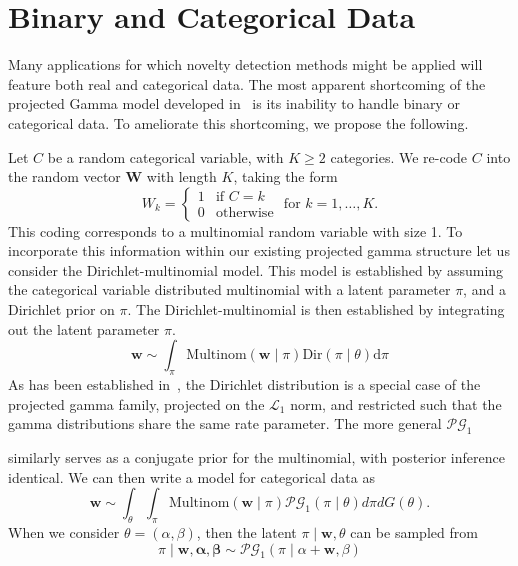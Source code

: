 \section{Binary and Categorical Data}
Many applications for which novelty detection methods might be applied will 
    feature both real and categorical data.   The most apparent 
    shortcoming of the projected Gamma model developed in~\cite{trubey:pg} is
    its inability to handle binary or categorical data.  To ameliorate this 
    shortcoming, we propose the following.

Let $C$ be a random categorical variable, with $K \geq 2$ categories.  We 
    re-code $C$ into the random vector $\bm{W}$ with length $K$, taking the form
    \begin{equation*}
        W_k = \begin{cases}
            1 &\text{if }C = k\\
            0 &\text{otherwise}
            \end{cases} \text{ for }k = 1,\ldots, K.
    \end{equation*}
    This coding corresponds to a multinomial random variable with size 1. To 
    incorporate this information within our existing projected gamma structure
    let us consider the Dirichlet-multinomial model.  This model is established by
    assuming the categorical variable distributed multinomial with a latent 
    parameter $\pi$, and a Dirichlet prior on $\pi$. The Dirichlet-multinomial is 
    then established by integrating out the latent parameter $\pi$. 
    \begin{equation*}
    \bm{w} \sim \int_{\pi} \text{Multinom}(\bm{w}\mid\pi)\text{Dir}(\pi\mid\theta)\text{d}\pi
    \end{equation*}
    As has been established in~\cite{trubey:pg}, the Dirichlet distribution is a 
    special case of the projected gamma family, projected on the $\mathcal{L}_1$ 
    norm, and restricted such that the gamma distributions share the same rate
    parameter. The more general $\mathcal{PG}_1$ 
    
    
    
    
    similarly serves as a conjugate prior 
    for the multinomial, with posterior inference identical.  We can then write a 
    model for categorical data as
    \begin{equation}
        \label{model:cat}
        \bm{w} \sim \int_{\theta}\int_{\pi}\text{Multinom}(\bm{w}\mid \pi)
                              \mathcal{PG}_1(\pi\mid \theta)d\pi dG(\theta).
    \end{equation}
    When we consider $\theta = (\alpha,\beta)$, then the latent 
    $\pi\mid \bm{w},\theta$ can be sampled from
    \begin{equation}
        \label{eqn:pifc}
        \pi\mid \bm{w},\bm{\alpha},\bm{\beta} \sim \mathcal{PG}_1(\pi\mid\alpha + \bm{w}, \beta)
    \end{equation}

